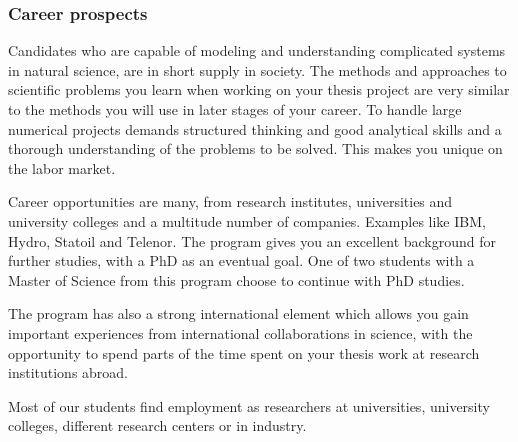 \documentclass{beamer}
\begin{document}
\begin{frame}
\frametitle{Career prospects}

\begin{block}{}
Candidates who are capable
of modeling and understanding complicated systems in natural science,
are in short supply in society.  The methods and approaches to
scientific problems you learn when working on your thesis project are
very similar to the methods you will use in later stages of your
career.  To handle large numerical projects demands structured
thinking and good analytical skills and a thorough understanding of
the problems to be solved. This makes you unique on the labor market.

Career opportunities are many, from research institutes, universities
and university colleges and a multitude number of companies. Examples
like IBM, Hydro, Statoil and Telenor.  The program gives you an
excellent background for further studies, with a PhD as an eventual
goal. One of two students with a Master of Science from this program
choose to continue with PhD studies.

The program has also a strong international element which allows you
gain important experiences from international collaborations in
science, with the opportunity to spend parts of the time spent on your
thesis work at research institutions abroad.

Most of our students find employment as researchers at universities,
university colleges, different research centers or in industry.
\end{block}
\end{frame}
\end{document}

